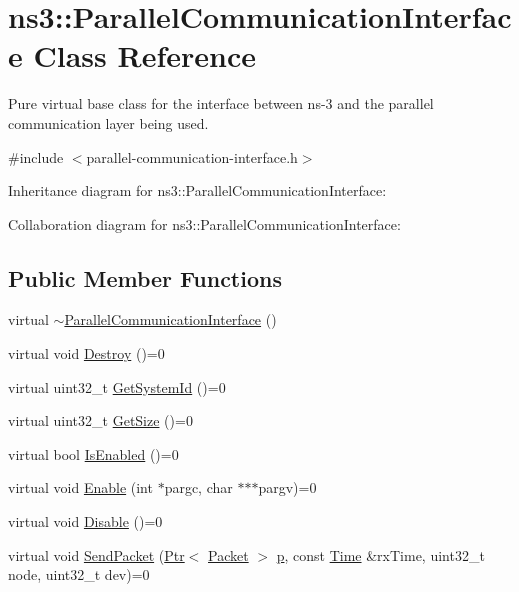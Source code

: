 \hypertarget{classns3_1_1ParallelCommunicationInterface}{}\section{ns3\+:\+:Parallel\+Communication\+Interface Class Reference}
\label{classns3_1_1ParallelCommunicationInterface}


Pure virtual base class for the interface between ns-\/3 and the parallel communication layer being used.  




{\ttfamily \#include $<$parallel-\/communication-\/interface.\+h$>$}



Inheritance diagram for ns3\+:\+:Parallel\+Communication\+Interface\+:


Collaboration diagram for ns3\+:\+:Parallel\+Communication\+Interface\+:
\subsection*{Public Member Functions}
\begin{DoxyCompactItemize}
\item 
virtual \hyperlink{classns3_1_1ParallelCommunicationInterface_aede871bf1c9d94d7a5670840e0a93484}{$\sim$\+Parallel\+Communication\+Interface} ()
\item 
virtual void \hyperlink{classns3_1_1ParallelCommunicationInterface_ab647bad738a7ae91d8a993880c7ece10}{Destroy} ()=0
\item 
virtual uint32\+\_\+t \hyperlink{classns3_1_1ParallelCommunicationInterface_a9070c6c68ffa2223d422f132ec8e27b9}{Get\+System\+Id} ()=0
\item 
virtual uint32\+\_\+t \hyperlink{classns3_1_1ParallelCommunicationInterface_ab9700002497437a15959e9009eedfcdb}{Get\+Size} ()=0
\item 
virtual bool \hyperlink{classns3_1_1ParallelCommunicationInterface_a5f7c1f671a8364f12e238c368ed4ad72}{Is\+Enabled} ()=0
\item 
virtual void \hyperlink{classns3_1_1ParallelCommunicationInterface_a0f73feee4076f27f3d80166656bdfdae}{Enable} (int $\ast$pargc, char $\ast$$\ast$$\ast$pargv)=0
\item 
virtual void \hyperlink{classns3_1_1ParallelCommunicationInterface_adeb1416b3a2e0185b376bbbf0d341fe4}{Disable} ()=0
\item 
virtual void \hyperlink{classns3_1_1ParallelCommunicationInterface_a0a95966814596b4e668825fb00756639}{Send\+Packet} (\hyperlink{classns3_1_1Ptr}{Ptr}$<$ \hyperlink{classns3_1_1Packet}{Packet} $>$ \hyperlink{lte__link__budget__x2__handover__measures_8m_ac9de518908a968428863f829398a4e62}{p}, const \hyperlink{classns3_1_1Time}{Time} \&rx\+Time, uint32\+\_\+t node, uint32\+\_\+t dev)=0
\end{DoxyCompactItemize}


